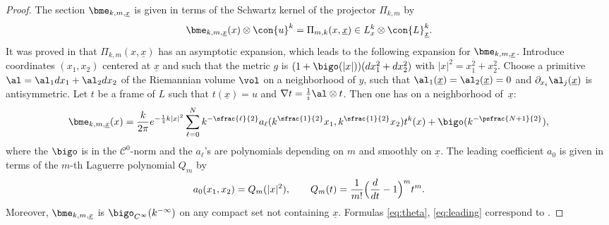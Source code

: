 \begin{proof}
The section $ \bme_{k,m,\underline{x}}$ is given in terms of the Schwartz kernel of
the projector $\Pi_{k,m}$ by
\begin{gather} \label{eq:noyau_coherent}
\bme_{k,m,\underline{x}} (x) \otimes \con{u}^k = \Pi_{m,k} (x, \underline{x})
\in L_x^k \otimes \con{L}_{\underline{x}}^k.
\end{gather}
It was proved in \cite{Landau1,Landau2} that $\Pi_{k,m} (x,\underline{x})$ has an
asymptotic expansion, which leads to the following expansion for $ \bme_{k,m,\underline{x}}$. Introduce coordinates $(x_1, x_2)$ centered at $\underline{x}$ and such that the metric $g$
is $(1 + \bigo (|x|)) (dx_1^2 + dx_2^2)$ with $|x|^2 = x_1^2 + x_2^2$. Choose a primitive $\al = \al_1
dx_1 + \al_2 dx_2 $ of the Riemannian volume $\vol$ on a neighborhood of $y$, such that $ \al_1 (\underline{x})
= \al_2 (\underline{x}) =0$ and $\partial_{x_i} \al_j (\underline{x})$ is antisymmetric. Let $t$ be a
frame of $L$ such that $t (\underline{x}) = u$ and $\nabla t = \tfrac{1}{i}
\al \otimes t$. Then one has on a neighborhood of~$\underline{x}$:
\begin{equation} \label{eq:theta}
\bme_{k,m,\underline{x}} (x) = \frac{k}{2 \pi} e^{-\frac{1}{4} k |x|^2 } \sum_{\ell
=0}^N k^{ -\sfrac{\ell}{2} } a_\ell (k^{\sfrac{1}{2} } x_1, k^{\sfrac{1}{2}}
x_2) t^k(x) + \bigo (k^{- \psfrac{N+1}{2}}),
\end{equation}
where the $\bigo $ is in the $\mathcal{C}^0$-norm and the $a_{\ell}$'s are polynomials depending on $m$ and smoothly on
$\underline{x}$. The leading coefficient $a_0$ is given in terms of the $m$-th
Laguerre polynomial $Q_m$ by
\begin{gather} \label{eq:leading}
a_0 (x_1, x_2) = Q_m (|x|^2), \qquad Q_m (t) = \frac{1}{m!} \Bigl(\frac{d}{dt}-1\Bigr)^m t^m.
\end{gather}
Moreover, $\bme_{k,m,\underline{x}}$ is $\bigo_{C^\infty} (k^{-\infty})$ on any compact set not
containing $\underline{x}$.
Formulas \eqref{eq:theta}, \eqref{eq:leading} correspond to \cite[Eqs.\,(26) \& (40)]{Landau1}.


\end{proof}
